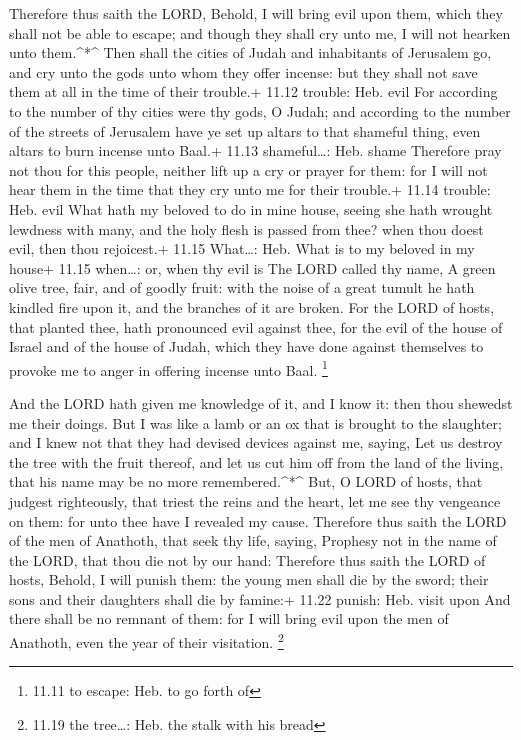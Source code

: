  Therefore thus saith the LORD, Behold, I will bring evil
upon them, which they shall not be able to escape; and though they shall
cry unto me, I will not hearken unto them.\^{}*\^{}  Then
shall the cities of Judah and inhabitants of Jerusalem go, and cry unto
the gods unto whom they offer incense: but they shall not save them at
all in the time of their trouble.+ 11.12 trouble: Heb. evil
 For according to the number of thy cities were thy gods, O
Judah; and according to the number of the streets of Jerusalem have ye
set up altars to that shameful thing, even altars to burn incense unto
Baal.+ 11.13 shameful\ldots: Heb. shame  Therefore pray not
thou for this people, neither lift up a cry or prayer for them: for I
will not hear them in the time that they cry unto me for their trouble.+
11.14 trouble: Heb. evil  What hath my beloved to do in
mine house, seeing she hath wrought lewdness with many, and the holy
flesh is passed from thee? when thou doest evil, then thou rejoicest.+
11.15 What\ldots: Heb. What is to my beloved in my house+ 11.15
when\ldots: or, when thy evil is  The LORD called thy name,
A green olive tree, fair, and of goodly fruit: with the noise of a great
tumult he hath kindled fire upon it, and the branches of it are broken.
 For the LORD of hosts, that planted thee, hath pronounced
evil against thee, for the evil of the house of Israel and of the house
of Judah, which they have done against themselves to provoke me to anger
in offering incense unto Baal. \footnote{11.11 to escape: Heb. to go
  forth of}

 And the LORD hath given me knowledge of it, and I know it:
then thou shewedst me their doings.  But I was like a lamb
or an ox that is brought to the slaughter; and I knew not that they had
devised devices against me, saying, Let us destroy the tree with the
fruit thereof, and let us cut him off from the land of the living, that
his name may be no more remembered.\^{}*\^{}  But, O LORD
of hosts, that judgest righteously, that triest the reins and the heart,
let me see thy vengeance on them: for unto thee have I revealed my
cause.  Therefore thus saith the LORD of the men of
Anathoth, that seek thy life, saying, Prophesy not in the name of the
LORD, that thou die not by our hand:  Therefore thus saith
the LORD of hosts, Behold, I will punish them: the young men shall die
by the sword; their sons and their daughters shall die by famine:+ 11.22
punish: Heb. visit upon  And there shall be no remnant of
them: for I will bring evil upon the men of Anathoth, even the year of
their visitation. \footnote{11.19 the tree\ldots: Heb. the stalk with
  his bread}

